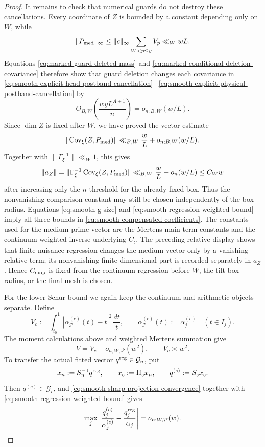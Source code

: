 \documentclass[11pt]{article}
\numberwithin{equation}{section}
\theoremstyle{definition}
\theoremstyle{remark}
\newcommand{\1}{\mathbf 1}
\begin{document}
\begin{proof}
It remains to check that numerical guards do not destroy these
cancellations.  Every coordinate of \(Z\) is bounded by a constant
depending only on \(W\), while
\[
 \|P_{\rm med}\|_\infty\leq\|c\|_\infty
       \sum_{W<p\leq y}V_p\ll_WwL.
\]
Equations \eqref{eq:marked-guard-deleted-mass} and
\eqref{eq:marked-conditional-deletion-covariance} therefore show that
guard deletion changes each covariance in
\eqref{eq:smooth-explicit-head-postband-cancellation}--
\eqref{eq:smooth-explicit-physical-postband-cancellation} by
\[
 O_{B,W}\!\left(\frac{wyL^{A+1}}n\right)
 =o_{n;B,W}(w/L).
\]
Since \(\dim Z\) is fixed after \(W\), we have proved the vector estimate
\begin{equation}
 \left\|\operatorname{Cov}_\xi(Z,P_{\rm med})\right\|
 \ll_{B,W}\frac wL+o_{n;B,W}(w/L).
 \label{eq:smooth-explicit-postband-nuisance-vector}
\end{equation}
Together with \(\|\Gamma_\xi^{-1}\|\ll_W1\), this gives
\[
 \|a_Z\|=\|\Gamma_\xi^{-1}\operatorname{Cov}_\xi(Z,P_{\rm med})\|
 \ll_{B,W}\frac wL+o_n(w/L)\leq C_Ww
\]
after increasing only the \(n\)-threshold for the already fixed box.
Thus the nonvanishing comparison constant may still be chosen
independently of the box radius.  Equations \eqref{eq:smooth-g-size} and
\eqref{eq:smooth-regression-weighted-bound} imply all three bounds in
\eqref{eq:smooth-compensated-coefficients}.  The constants used for the
medium-prime vector are the Mertens main-term constants and the continuum
weighted inverse underlying \(C_{\sharp}\).  The preceding relative
display shows that finite nuisance regression changes the medium vector
only by a vanishing relative term; its nonvanishing finite-dimensional
part is recorded separately in \(a_Z\).  Hence \(C_{\rm cmp}\) is fixed
from the continuum regression before \(W\), the tilt-box radius, or the
final mesh is chosen.

For the lower Schur bound we again keep the continuum and arithmetic
objects separate.  Define
\begin{equation}
 V_c:=\int_{t_0}^1
       |\alpha_{\mathcal P}^{(c)}(t)-t|^2\,\frac{dt}{t},
 \qquad \alpha_{\mathcal P}^{(c)}(t):=\alpha_j^{(c)}\quad(t\in I_j).
 \label{eq:smooth-continuum-cell-variance}
\end{equation}
The moment calculations above and weighted Mertens summation give
\begin{equation}
 V=V_c+o_{n;W,\mathcal P}(w^2),\qquad V_c\asymp w^2.
 \label{eq:smooth-two-cell-variances}
\end{equation}
To transfer the actual fitted vector \(q^{\rm reg}\in\mathcal G_n\),
put
\begin{equation}
 x_n:=S_n^{-1}q^{\rm reg},\qquad
 x_c:=\Pi_cx_n,\qquad q^{(c)}:=S_cx_c.
 \label{eq:smooth-regression-continuum-identification}
\end{equation}
Then \(q^{(c)}\in\mathcal G_c\), and
\eqref{eq:smooth-sharp-projection-convergence} together with
\eqref{eq:smooth-regression-weighted-bound} gives
\begin{equation}
 \max_j\left|
   \frac{q_j^{(c)}}{\alpha_j^{(c)}}
       -\frac{q_j^{\rm reg}}{\alpha_j}\right|
       =o_{n;W,\mathcal P}(w).
 \label{eq:smooth-regression-two-gauges-relative}
\end{equation}


\end{proof}
\end{document}
